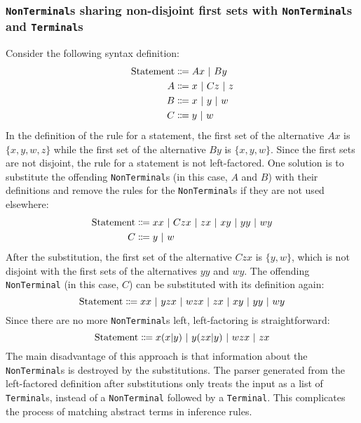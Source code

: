 \subsubsection{\texorpdfstring{\lstinline{NonTerminal}}{NonTerminal}s sharing non-disjoint first sets with \texorpdfstring{\lstinline{NonTerminal}}{NonTerminal}s and \mbox{\texorpdfstring{\lstinline{Terminal}}{Terminal}s}}
\label{syntax:factorisation:nonterm}
Consider the following syntax definition:
\begin{align*}
    \text{Statement} &\Coloneqq Ax \ |\  By \\
    A &\Coloneqq x \ |\  Cz \ |\  z \\
    B &\Coloneqq x \ |\  y \ |\  w \\
    C &\Coloneqq y \ |\  w
\end{align*}
In the definition of the rule for a statement, the first set of the alternative $Ax$ is $\{ x, y, w, z \}$ while the first set of the alternative $By$ is $\{ x, y, w \}$. Since the first sets are not disjoint, the rule for a statement is not left-factored. One solution is to substitute the offending \lstinline{NonTerminal}s (in this case, $A$ and $B$) with their definitions and remove the rules for the \lstinline{NonTerminal}s if they are not used elsewhere:
\begin{align*}
    \text{Statement} &\Coloneqq xx \ |\  Czx \ |\  zx \ |\  xy \ |\  yy \ |\  wy \\
    C &\Coloneqq y \ |\  w
\end{align*}
After the substitution, the first set of the alternative $Czx$ is $\{ y, w \}$, which is not disjoint with the first sets of the alternatives $yy$ and $wy$. The offending \lstinline{NonTerminal} (in this case, $C$) can be substituted with its definition again:
\[
    \text{Statement} \Coloneqq xx \ |\  yzx \ |\  wzx \ |\  zx \ |\  xy \ |\  yy \ |\  wy
\]
Since there are no more \lstinline{NonTerminal}s left, left-factoring is straightforward:
\[
    \text{Statement} \Coloneqq x(x|y) \ |\  y(zx|y) \ |\  wzx \ |\  zx
\]
The main disadvantage of this approach is that information about the \lstinline{NonTerminal}s is destroyed by the substitutions. The parser generated from the left-factored definition after substitutions only treats the input as a list of \lstinline{Terminal}s, instead of a \lstinline{NonTerminal} followed by a \lstinline{Terminal}. This complicates the process of matching abstract terms in inference rules.

